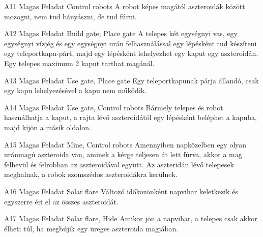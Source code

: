 \documentclass[../../projlab]{subfiles}
\begin{document}
\begin{funkovetelmeny}
	{A11}
	{Magas}
	{Feladat}
	{Control robots}
	{}
	{A robot képes magától aszteroidák között mozogni, nem tud bányászni, de tud fúrni.}
    
\end{funkovetelmeny}

\begin{funkovetelmeny}
	{A12}
	{Magas}
	{Feladat}
	{Build gate, Place gate}
	{}
	{A telepes két egységnyi vas, egy egységnyi vízjég és egy egységnyi urán felhasználással egy lépésként tud készíteni egy teleportkapu-párt, majd egy lépésként lehelyezhet egy kaput egy aszteroidán. Egy telepes maximum 2 kaput tarthat magánál.}
    
\end{funkovetelmeny}

\begin{funkovetelmeny}
	{A13}
	{Magas}
	{Feladat}
	{Use gate, Place gate}
	{}
	{Egy teleportkapunak párja állandó, csak egy kapu lehelyezésével a kapu nem működik.}
    
\end{funkovetelmeny}

\begin{funkovetelmeny}
	{A14}
	{Magas}
	{Feladat}
	{Use gate, Control robots}
	{}
	{Bármely telepes és robot használhatja a kaput, a rajta lévő aszteroidától egy lépésként beléphet a kapuba, majd kijön a másik oldalon.}
    
\end{funkovetelmeny}

\begin{funkovetelmeny}
	{A15}
	{Magas}
	{Feladat}
	{Mine, Control robots}
	{}
	{Amennyiben napközelben egy olyan uránmagú aszteroida van, aminek a kérge teljesen át lett fúrva, akkor a mag felhevül és felrobban az aszteroidával együtt. Az aszteridán lévő telepesek meghalnak, a robok szomszédos aszteroidákra kerülnek.}
    
\end{funkovetelmeny}

\begin{funkovetelmeny}
	{A16}
	{Magas}
	{Feladat}
	{Solar flare}
	{}
	{Változó időközönként napvihar keletkezik és egyszerre éri el az összes aszteroidát.}
    
\end{funkovetelmeny}

\begin{funkovetelmeny}
	{A17}
	{Magas}
	{Feladat}
	{Solar flare, Hide}
	{}
	{Amikor jön a napvihar, a telepes csak akkor élheti túl, ha megbújik egy üreges aszteroida magjában. }
    
\end{funkovetelmeny}
\end{document}
